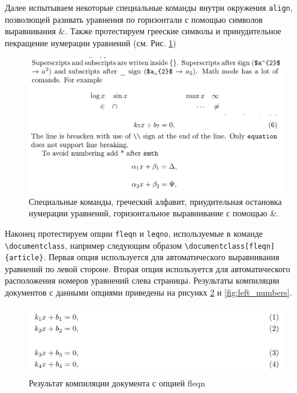 \documentclass{article}
\begin{document}
Далее испытываем некоторые специальные команды внутри окружения \verb|align|, позволющей разивать уравнения по горизонтали с помощью символов выравнивания \&. Также протестируем грееские символы и принудительное пекращение нумерации уравнений (см. Рис. \ref{fig:special_symbols})

\begin{figure}[H]
  \centering
  \includegraphics[width=\textwidth]{images/special_symbols.png}
  \caption{Специальные команды, греческий алфавит, приудительная остановка нумерации уравнений, горизонтальное выравнивание с помощью \&.}
  \label{fig:special_symbols}
\end{figure}

Наконец протестируем опции \verb|fleqn| и \verb|leqno|, используемые в команде \verb|\documentclass|, например следующим образом \verb|\documentclass[fleqn]{article}|. Первая опция используется для автоматического выравнивания уравнений по левой стороне. Вторая опция используется для автоматического расположения номеров уравнений слева страницы. Результаты компиляции документов с данными опциями приведены на рисункх  \ref{fig:left_aligment} и \ref{fig:left_numbers}.

\begin{figure}[H]
  \centering
  \includegraphics[width=\textwidth]{images/left_aligment.png}
  \caption{Результат компиляции документа с опцией  fleqn}
  \label{fig:left_aligment}
\end{figure}
\end{document}

